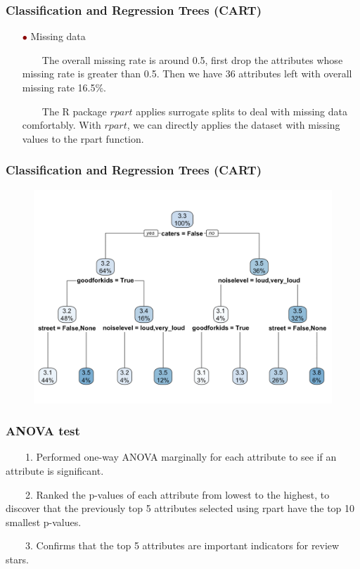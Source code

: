 \documentclass[notheorems, aspectratio=54]{beamer}
\renewcommand\textbullet{\ensuremath{\bullet}}
\begin{document}
\begin{frame}
\frametitle{Classification and Regression Trees (CART)}
\begin{itemize}
	\item[\textcolor{darkred}{\textbullet}] Missing data
	
	\vspace{2ex}
	
	\ \ \ \ The overall missing rate is around 0.5, first drop the attributes whose missing rate is greater than 0.5. Then we have 36 attributes left with overall missing rate 16.5\%. 
\vspace{2ex}

	\ \ \ \ The R package $rpart$ applies surrogate splits to deal with missing data comfortably. With $rpart$, we can directly applies the dataset with missing values to the rpart function.
\end{itemize}


\end{frame}

\begin{frame}
\frametitle{Classification and Regression Trees (CART)}

\begin{figure}
    \centering
    \includegraphics[width=4.5in]{rpart_tree.png}
\end{figure}
\end{frame}

\begin{frame}
\frametitle{ANOVA test}
 \ \ \ \ 1. Performed one-way ANOVA marginally for each attribute to see if an attribute is significant. 
 \vspace{2ex}
 
 \ \ \ \ 2. Ranked the p-values of each attribute from lowest to the highest, to discover that the previously top 5 attributes selected using rpart have the top 10 smallest p-values. 
 \vspace{2ex} 
 
 \ \ \ \ 3. Confirms that the top 5 attributes are important indicators for review stars.
\end{frame}
\end{document}
